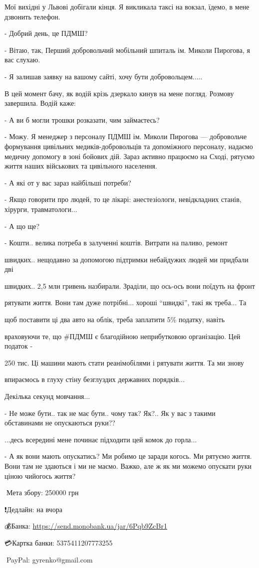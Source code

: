Мої вихідні у Львові добігали кінця. Я викликала таксі на вокзал, їдемо, в мене дзвонить телефон. \par
- Добрий день, це ПДМШ? \par
- Вітаю, так, Перший добровольчий мобільний шпиталь ім. Миколи Пирогова, я вас слухаю. \par
- Я залишав заявку на вашому сайті, хочу бути добровольцем.....\par
В цей момент бачу, як водій крізь дзеркало кинув на мене погляд. Розмову завершила. Водій каже:\par
- А ви б могли трошки розказати, чим займаєтесь? \par
- Можу. Я менеджер з персоналу ПДМШ ім. Миколи Пирогова — добровольче формування цивільних медиків-добровольців та допоміжного персоналу, надаємо медичну допомогу в зоні бойових дій. Зараз активно працюємо на Сході, рятуємо життя наших військових та цивільного населення. \par
- А які от у вас зараз найбільші потреби? \par
- Якщо говорити про людей, то це лікарі: анестезіологи, невідкладних станів, хірурги, травматологи...\par
- А що ще? \par
- Кошти.. велика потреба в залученні коштів. Витрати на паливо, ремонт\par
швидких.. нещодавно за допомогою підтримки небайдужих людей ми придбали дві\par
швидких.. 2,5 млн гривень назбирали. Зраділи, що ось-ось вони поїдуть на фронт\par
рятувати життя. Вони там дуже потрібні... хороші \enquote{швидкі}, такі як треба... Та\par
щоб поставити ці два авто на облік, треба заплатити 5\% податку, навіть\par
враховуючи те, що \#ПДМШ є благодійною неприбутковою організацію. Цей податок -\par
250 тис. Ці машини мають стати реанімобілями і рятувати життя. Та ми знову\par
впираємось в глуху стіну безглуздих державних порядків... \par
Декілька секунд мовчання... \par
- Не може бути.. так не має бути.. чому так? Як?.. Як у вас з такими обставинами не опускаються руки??\par
...десь всередині мене починає підходити цей комок до горла...\par
- А як вони мають опускатись? Ми робимо це заради когось. Ми рятуємо життя. Вони там не здаються і ми не маємо. Важко, але ж як ми можемо опускати руки ціною чийогось життя? \par
🎯Мета збору: 250000 грн\par
❗️Дедлайн: на вчора\par
💰Банка: \url{https://send.monobank.ua/jar/6Pqb9ZcBr1}\par
💳Картка банки: 5375411207773255\par
📩PayPal: gyrenko@gmail.com\par
